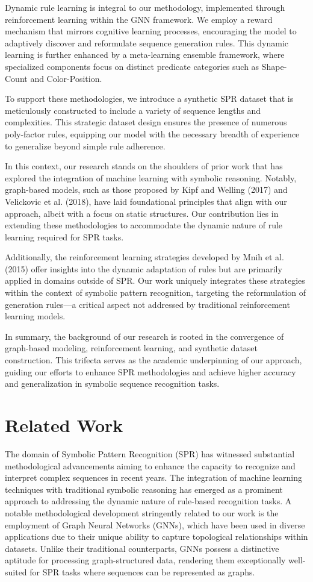 \documentclass{article}
\begin{document}
Dynamic rule learning is integral to our methodology, implemented through reinforcement learning within the GNN framework. We employ a reward mechanism that mirrors cognitive learning processes, encouraging the model to adaptively discover and reformulate sequence generation rules. This dynamic learning is further enhanced by a meta-learning ensemble framework, where specialized components focus on distinct predicate categories such as Shape-Count and Color-Position.

To support these methodologies, we introduce a synthetic SPR dataset that is meticulously constructed to include a variety of sequence lengths and complexities. This strategic dataset design ensures the presence of numerous poly-factor rules, equipping our model with the necessary breadth of experience to generalize beyond simple rule adherence.

In this context, our research stands on the shoulders of prior work that has explored the integration of machine learning with symbolic reasoning. Notably, graph-based models, such as those proposed by Kipf and Welling (2017) and Velickovic et al. (2018), have laid foundational principles that align with our approach, albeit with a focus on static structures. Our contribution lies in extending these methodologies to accommodate the dynamic nature of rule learning required for SPR tasks.

Additionally, the reinforcement learning strategies developed by Mnih et al. (2015) offer insights into the dynamic adaptation of rules but are primarily applied in domains outside of SPR. Our work uniquely integrates these strategies within the context of symbolic pattern recognition, targeting the reformulation of generation rules—a critical aspect not addressed by traditional reinforcement learning models.

In summary, the background of our research is rooted in the convergence of graph-based modeling, reinforcement learning, and synthetic dataset construction. This trifecta serves as the academic underpinning of our approach, guiding our efforts to enhance SPR methodologies and achieve higher accuracy and generalization in symbolic sequence recognition tasks.

\section{Related Work}
The domain of Symbolic Pattern Recognition (SPR) has witnessed substantial methodological advancements aiming to enhance the capacity to recognize and interpret complex sequences in recent years. The integration of machine learning techniques with traditional symbolic reasoning has emerged as a prominent approach to addressing the dynamic nature of rule-based recognition tasks. A notable methodological development stringently related to our work is the employment of Graph Neural Networks (GNNs), which have been used in diverse applications due to their unique ability to capture topological relationships within datasets. Unlike their traditional counterparts, GNNs possess a distinctive aptitude for processing graph-structured data, rendering them exceptionally well-suited for SPR tasks where sequences can be represented as graphs.
\end{document}
